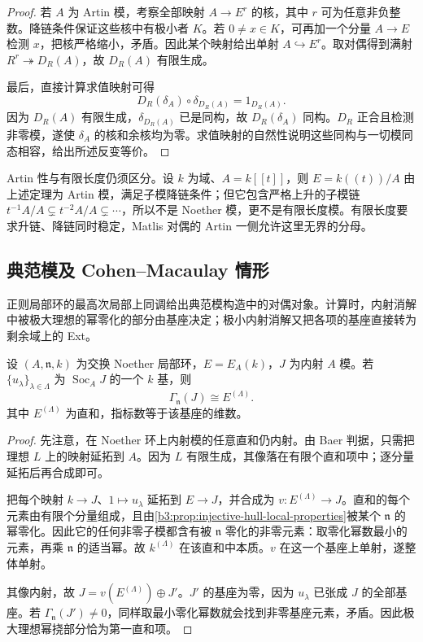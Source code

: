 \begin{proof}
	若 \(A\) 为 Artin 模，考察全部映射 \(A\rightarrow E^r\) 的核，其中 \(r\) 可为任意非负整数。降链条件保证这些核中有极小者 \(K\)。若 \(0\ne x\in K\)，可再加一个分量 \(A\rightarrow E\) 检测 \(x\)，把核严格缩小，矛盾。因此某个映射给出单射 \(A\hookrightarrow E^r\)。取对偶得到满射 \(R^r\twoheadrightarrow D_R(A)\)，故 \(D_R(A)\) 有限生成。

	最后，直接计算求值映射可得
	\[
		D_R(\delta_A)\circ\delta_{D_R(A)} =1_{D_R(A)}.
	\]
	因为 \(D_R(A)\) 有限生成，\(\delta_{D_R(A)}\) 已是同构，故 \(D_R(\delta_A)\) 同构。\(D_R\) 正合且检测非零模，遂使 \(\delta_A\) 的核和余核均为零。求值映射的自然性说明这些同构与一切模同态相容，给出所述反变等价。
\end{proof}

Artin 性与有限长度仍须区分。设 \(k\) 为域、\(A=k[\![t]\!]\)，则 \(E=k(\!(t)\!)/A\) 由上述定理为 Artin 模，满足子模降链条件；但它包含严格上升的子模链 \(t^{-1}A/A\subsetneq t^{-2}A/A\subsetneq\cdots\)，所以不是 Noether 模，更不是有限长度模。有限长度要求升链、降链同时稳定，Matlis 对偶的 Artin 一侧允许这里无界的分母。

\subsection{典范模及 Cohen–Macaulay 情形}
\label{b3:subsec:2202:05}

正则局部环的最高次局部上同调给出典范模构造中的对偶对象。计算时，内射消解中被极大理想的幂零化的部分由基座决定；极小内射消解又把各项的基座直接转为剩余域上的 Ext。

\begin{lemma}\label{b3:lem:injective-maximal-torsion}
	设 \((A,\mathfrak n,k)\) 为交换 Noether 局部环，\(E=E_A(k)\)，\(J\) 为内射 \(A\) 模。若 \(\{u_\lambda\}_{\lambda\in\Lambda}\) 为 \(\operatorname{Soc}_A J\) 的一个 \(k\) 基，则
	\[
		\Gamma_{\mathfrak n}(J)\cong E^{(\Lambda)}.
	\]
	其中 \(E^{(\Lambda)}\) 为直和，指标数等于该基座的维数。
\end{lemma}
\begin{proof}
	先注意，在 Noether 环上内射模的任意直和仍内射。由 Baer 判据，只需把理想 \(L\) 上的映射延拓到 \(A\)。因为 \(L\) 有限生成，其像落在有限个直和项中；逐分量延拓后再合成即可。

	把每个映射 \(k\rightarrow J\)、\(1\mapsto u_\lambda\) 延拓到 \(E\rightarrow J\)，并合成为 \(v:E^{(\Lambda)}\rightarrow J\)。直和的每个元素由有限个分量组成，且由\cref{b3:prop:injective-hull-local-properties}被某个 \(\mathfrak n\) 的幂零化。因此它的任何非零子模都含有被 \(\mathfrak n\) 零化的非零元素：取零化幂数最小的元素，再乘 \(\mathfrak n\) 的适当幂。故 \(k^{(\Lambda)}\) 在该直和中本质。\(v\) 在这一个基座上单射，遂整体单射。

	其像内射，故 \(J=v(E^{(\Lambda)})\oplus J'\)。\(J'\) 的基座为零，因为 \(u_\lambda\) 已张成 \(J\) 的全部基座。若 \(\Gamma_{\mathfrak n}(J')\ne0\)，同样取最小零化幂数就会找到非零基座元素，矛盾。因此极大理想幂挠部分恰为第一直和项。
\end{proof}

